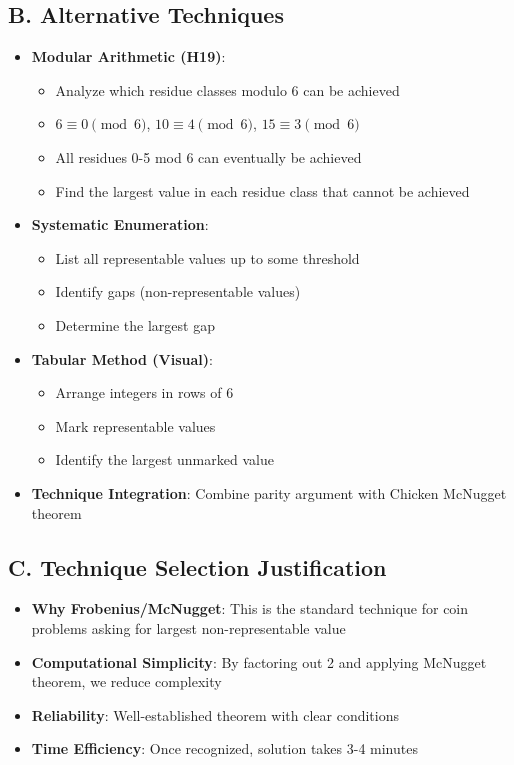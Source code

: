 \documentclass[12pt]{article}
\begin{document}
\begin{techniquesbox}
\subsection*{B. Alternative Techniques}
\begin{itemize}[leftmargin=*]
    \item \textbf{Modular Arithmetic (H19)}: 
    \begin{itemize}
        \item Analyze which residue classes modulo 6 can be achieved
        \item $6 \equiv 0 \pmod{6}$, $10 \equiv 4 \pmod{6}$, $15 \equiv 3 \pmod{6}$
        \item All residues 0-5 mod 6 can eventually be achieved
        \item Find the largest value in each residue class that cannot be achieved
    \end{itemize}
    \item \textbf{Systematic Enumeration}: 
    \begin{itemize}
        \item List all representable values up to some threshold
        \item Identify gaps (non-representable values)
        \item Determine the largest gap
    \end{itemize}
    \item \textbf{Tabular Method (Visual)}:
    \begin{itemize}
        \item Arrange integers in rows of 6
        \item Mark representable values
        \item Identify the largest unmarked value
    \end{itemize}
    \item \textbf{Technique Integration}: Combine parity argument with Chicken McNugget theorem
\end{itemize}

\subsection*{C. Technique Selection Justification}
\begin{itemize}[leftmargin=*]
    \item \textbf{Why Frobenius/McNugget}: This is the standard technique for coin problems asking for largest non-representable value
    \item \textbf{Computational Simplicity}: By factoring out 2 and applying McNugget theorem, we reduce complexity
    \item \textbf{Reliability}: Well-established theorem with clear conditions
    \item \textbf{Time Efficiency}: Once recognized, solution takes 3-4 minutes
\end{itemize}
\end{techniquesbox}
\end{document}
